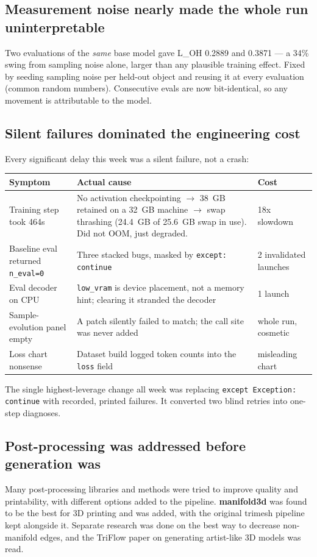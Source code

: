 \documentclass[11pt,a4paper]{article}
\begin{document}
\subsection{Measurement noise nearly made the whole run uninterpretable}
Two evaluations of the \textit{same} base model gave L\_OH 0.2889 and 0.3871 --- a 34\% swing from
sampling noise alone, larger than any plausible training effect. Fixed by seeding sampling noise per
held-out object and reusing it at every evaluation (common random numbers). Consecutive evals are now
bit-identical, so any movement is attributable to the model.

\subsection{Silent failures dominated the engineering cost}
Every significant delay this week was a silent failure, not a crash:

\begin{center}\small
\begin{tabular}{@{}lll@{}}
\toprule
\textbf{Symptom} & \textbf{Actual cause} & \textbf{Cost} \\
\midrule
Training step took 464s & No activation checkpointing $\rightarrow$ 38~GB retained on a 32~GB machine $\rightarrow$ swap thrashing (24.4~GB of 25.6~GB swap in use). Did not OOM, just degraded. & 18x slowdown \\
Baseline eval returned \texttt{n\_eval=0} & Three stacked bugs, masked by \texttt{except: continue} & 2 invalidated launches \\
Eval decoder on CPU & \texttt{low\_vram} is device placement, not a memory hint; clearing it stranded the decoder & 1 launch \\
Sample-evolution panel empty & A patch silently failed to match; the call site was never added & whole run, cosmetic \\
Loss chart nonsense & Dataset build logged token counts into the \texttt{loss} field & misleading chart \\
\bottomrule
\end{tabular}
\end{center}
{\small The single highest-leverage change all week was replacing \texttt{except Exception: continue}
with recorded, printed failures. It converted two blind retries into one-step diagnoses.}

\subsection{Post-processing was addressed before generation was}
Many post-processing libraries and methods were tried to improve quality and printability, with
different options added to the pipeline. \textbf{manifold3d} was found to be the best for 3D printing and
was added, with the original trimesh pipeline kept alongside it. Separate research was done on the
best way to decrease non-manifold edges, and the TriFlow paper on generating artist-like 3D models
was read.
\end{document}

